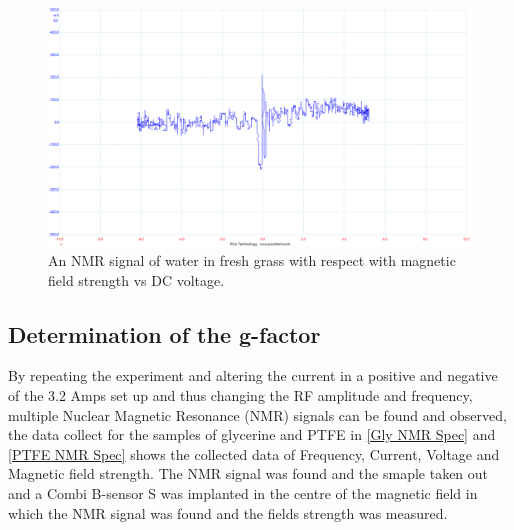 \documentclass[12pt]{article}
\begin{document}
\begin{figure}[H]
\centering
\includegraphics[scale=0.45]{Images/Report/Part A/6B.png}
\caption{An NMR signal of water in fresh grass with respect with magnetic field strength vs DC voltage.}
\label{Part 1 6B}
\end{figure}

\subsection{Determination of the g-factor}
\label{Determination of the g-factor SubSection}

By repeating the experiment and altering the current in a positive and negative of the 3.2 Amps set up and thus changing the RF amplitude and frequency, multiple Nuclear Magnetic Resonance (NMR) signals can be found and observed, the data collect for the samples of glycerine and PTFE in \cref{Gly NMR Spec} and \cref{PTFE NMR Spec} shows the collected data of Frequency, Current, Voltage and Magnetic field strength. The NMR signal was found and the smaple taken out and a Combi B-sensor S was implanted in the centre of the magnetic field in which the NMR signal was found and the fields strength was measured. \\
\end{document}
